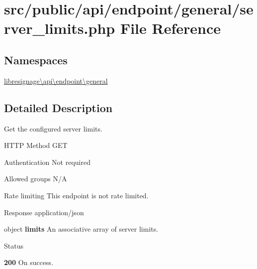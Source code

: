 \hypertarget{src_2public_2api_2endpoint_2general_2server__limits_8php}{}\section{src/public/api/endpoint/general/server\+\_\+limits.php File Reference}
\label{src_2public_2api_2endpoint_2general_2server__limits_8php}
\subsection*{Namespaces}
\begin{DoxyCompactItemize}
\item 
 \hyperlink{namespacelibresignage_1_1api_1_1endpoint_1_1general}{libresignage\textbackslash{}api\textbackslash{}endpoint\textbackslash{}general}
\end{DoxyCompactItemize}


\subsection{Detailed Description}
Get the configured server limits.

\begin{DoxyParagraph}{H\+T\+TP Method}
G\+ET 
\end{DoxyParagraph}
\begin{DoxyParagraph}{Authentication}
Not required 
\end{DoxyParagraph}
\begin{DoxyParagraph}{Allowed groups}
{\ttfamily N/A} 
\end{DoxyParagraph}
\begin{DoxyParagraph}{Rate limiting}
This endpoint is not rate limited.
\end{DoxyParagraph}
\begin{DoxyParagraph}{Response}
application/json
\begin{DoxyItemize}
\item {\ttfamily object} {\bfseries limits} An associative array of server limits.
\end{DoxyItemize}
\end{DoxyParagraph}
\begin{DoxyParagraph}{Status}

\begin{DoxyItemize}
\item {\bfseries 200} On success. 
\end{DoxyItemize}
\end{DoxyParagraph}
